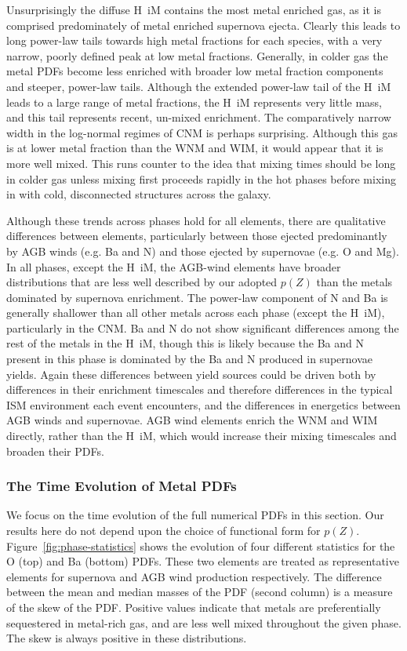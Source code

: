 \documentclass[twocolumn]{aastex61}
\begin{document}
Unsurprisingly the diffuse H~{\sc i}M contains the most metal enriched gas, as it is comprised predominately of metal enriched supernova ejecta. Clearly this leads to long power-law tails towards high metal fractions for each species, with a very narrow, poorly defined peak at low metal fractions. Generally, in colder gas the metal PDFs become less enriched with broader low metal fraction components and steeper, power-law tails. Although the extended power-law tail of the H~{\sc i}M leads to a large range of metal fractions, the H~{\sc i}M represents very little mass, and this tail represents recent, un-mixed enrichment. The comparatively narrow width in the log-normal regimes of CNM is perhaps surprising. Although this gas is at lower metal fraction than the WNM and WIM, it would appear that it is more well mixed. This runs counter to the idea that mixing times should be long in colder gas unless mixing first proceeds rapidly in the hot phases before mixing in with cold, disconnected structures across the galaxy.

Although these trends across phases hold for all elements, there are qualitative differences between elements, particularly between those ejected predominantly by AGB winds (e.g. Ba and N) and those ejected by supernovae (e.g. O and Mg). In all phases, except the H~{\sc i}M, the AGB-wind elements have broader distributions that are less well described by our adopted $p(Z)$ than the metals dominated by supernova enrichment. The power-law component of N and Ba is generally shallower than all other metals across each phase (except the H~{\sc i}M), particularly in the CNM. Ba and N do not show significant differences among the rest of the metals in the H~{\sc i}M, though this is likely because the Ba and N present in this phase is dominated by the Ba and N produced in supernovae yields. Again these differences between yield sources could be driven both by differences in their enrichment timescales and therefore differences in the typical ISM environment each event encounters, and the differences in energetics between AGB winds and supernovae. AGB wind elements enrich the WNM and WIM directly, rather than the H~{\sc i}M, which would increase their mixing timescales and broaden their PDFs.

\subsubsection{The Time Evolution of Metal PDFs}
\label{sec:statistics}
We focus on the time evolution of the full numerical PDFs in this section. Our results here do not depend upon the choice of functional form for $p(Z)$. Figure~\ref{fig:phase-statistics} shows the evolution of four different statistics for the O (top) and Ba (bottom) PDFs. These two elements are treated as representative elements for supernova and AGB wind production respectively. The difference between the mean and median masses of the PDF (second column) is a measure of the skew of the PDF. Positive values indicate that metals are preferentially sequestered in metal-rich gas, and are less well mixed throughout the given phase. The skew is always positive in these distributions.
\end{document}
